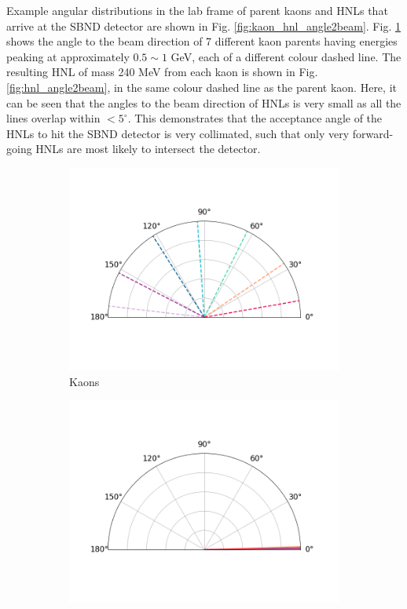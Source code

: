 Example angular distributions in the lab frame of parent kaons and HNLs that arrive at the SBND detector are shown in Fig. \ref{fig:kaon_hnl_angle2beam}.
Fig. \ref{fig:kaon_angle2beam} shows the angle to the beam direction of 7 different kaon parents having energies peaking at approximately $0.5\sim1$ GeV, each of a different colour dashed line.
The resulting HNL of mass 240 MeV from each kaon is shown in Fig. \ref{fig:hnl_angle2beam}, in the same colour dashed line as the parent kaon.
Here, it can be seen that the angles to the beam direction of HNLs is very small as all the lines overlap within $ < 5^\circ$.
This demonstrates that the acceptance angle of the HNLs to hit the SBND detector is very collimated, such that only very forward-going HNLs are most likely to intersect the detector.

\begin{figure}[htbp!]
        \centering
        \begin{subfigure}[b]{0.495\textwidth}
            \centering
            \includegraphics[width=\textwidth]{kaon_angle}
            \caption{Kaons}%
            \label{fig:kaon_angle2beam}
        \end{subfigure}
        \hfill
        \begin{subfigure}[b]{0.495\textwidth}  
            \centering 
            \includegraphics[width=\textwidth]{hnl_angle}

\end{subfigure}
\end{figure}
